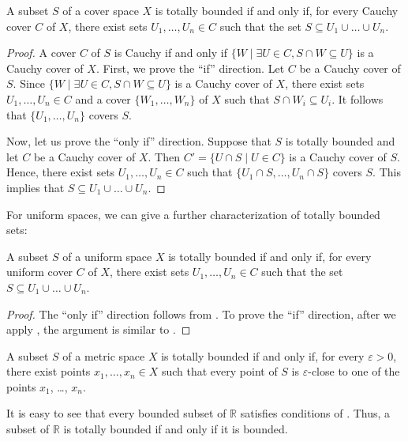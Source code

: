 \documentclass[reqno]{amsart}
\theoremstyle{definition}
\theoremstyle{remark}
\numberwithin{figure}{section}
\begin{document}
\begin{prop}
A subset $S$ of a cover space $X$ is totally bounded if and only if, for every Cauchy cover $C$ of $X$, there exist sets $U_1, \ldots, U_n \in C$ such that the set $S \subseteq U_1 \cup \ldots \cup U_n$.
\end{prop}
\begin{proof}
A cover $C$ of $S$ is Cauchy if and only if $\{ W \mid \exists U \in C, S \cap W \subseteq U \}$ is a Cauchy cover of $X$.
First, we prove the ``if'' direction.
Let $C$ be a Cauchy cover of $S$.
Since $\{ W \mid \exists U \in C, S \cap W \subseteq U \}$ is a Cauchy cover of $X$, there exist sets $U_1, \ldots, U_n \in C$ and a cover $\{ W_1, \ldots, W_n \}$ of $X$ such that $S \cap W_i \subseteq U_i$.
It follows that $\{ U_1, \ldots, U_n \}$ covers $S$.

Now, let us prove the ``only if'' direction.
Suppose that $S$ is totally bounded and let $C$ be a Cauchy cover of $X$.
Then $C' = \{ U \cap S \mid U \in C \}$ is a Cauchy cover of $S$.
Hence, there exist sets $U_1, \ldots, U_n \in C$ such that $\{ U_1 \cap S, \ldots, U_n \cap S \}$ covers $S$.
This implies that $S \subseteq U_1 \cup \ldots \cup U_n$.
\end{proof}

For uniform spaces, we can give a further characterization of totally bounded sets:

\begin{prop}
A subset $S$ of a uniform space $X$ is totally bounded if and only if, for every uniform cover $C$ of $X$, there exist sets $U_1, \ldots, U_n \in C$ such that the set $S \subseteq U_1 \cup \ldots \cup U_n$.
\end{prop}
\begin{proof}
The ``only if'' direction follows from .
To prove the ``if'' direction, after we apply , the argument is similar to .
\end{proof}

\begin{cor}[tb-metric]
A subset $S$ of a metric space $X$ is totally bounded if and only if, for every $\varepsilon > 0$,
there exist points $x_1, \ldots, x_n \in X$ such that every point of $S$ is $\varepsilon$-close to one of the points $x_1$, \ldots, $x_n$.
\end{cor}

\begin{example}
It is easy to see that every bounded subset of $\mathbb{R}$ satisfies conditions of .
Thus, a subset of $\mathbb{R}$ is totally bounded if and only if it is bounded.
\end{example}
\end{document}

